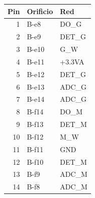 \begin{tabular}{r l p{39mm}}
\toprule Pin & Orificio & Red\\\midrule
1 & B-e8 & DO\_G\\
2 & B-e9 & DET\_G\\
3 & B-e10 & G\_W\\
4 & B-e11 & +3.3VA\\
5 & B-e12 & DET\_G\\
6 & B-e13 & ADC\_G\\
7 & B-e14 & ADC\_G\\
8 & B-f14 & DO\_M\\
9 & B-f13 & DET\_M\\
10 & B-f12 & M\_W\\
11 & B-f11 & GND\\
12 & B-f10 & DET\_M\\
13 & B-f9 & ADC\_M\\
14 & B-f8 & ADC\_M\\
\bottomrule\end{tabular}
